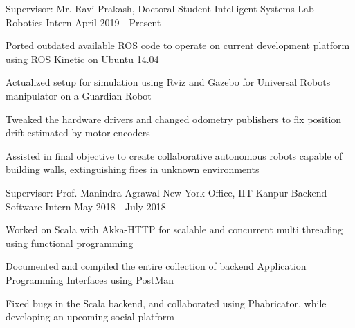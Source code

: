 \begin{cventries}

  \cventry
    {Supervisor: Mr. Ravi Prakash, Doctoral Student}
    {Intelligent Systems Lab}
    {Robotics Intern}
    {April 2019 - Present}
    {
      \begin{cvitems}
        \item{Ported outdated available ROS code to operate on current development platform using ROS Kinetic on Ubuntu 14.04}
        \item{Actualized setup for simulation using Rviz and Gazebo for Universal Robots manipulator on a Guardian Robot}
        \item{Tweaked the hardware drivers and changed odometry publishers to fix position drift estimated by motor encoders}
        \item{Assisted in final objective to create collaborative autonomous robots capable of building walls, extinguishing fires in unknown environments}
      \end{cvitems}
    }  

  \cventry
    {Supervisor: Prof. Manindra Agrawal}
    {New York Office, IIT Kanpur}
    {Backend Software Intern}
    {May 2018 - July 2018}
    {
      \begin{cvitems}
        \item{Worked on Scala with Akka-HTTP for scalable and concurrent multi threading using functional programming}
        \item{Documented and compiled the entire collection of backend Application Programming Interfaces using PostMan}
        \item{Fixed bugs in the Scala backend, and collaborated using Phabricator, while developing an upcoming social platform}
      \end{cvitems}
    }

\end{cventries}

